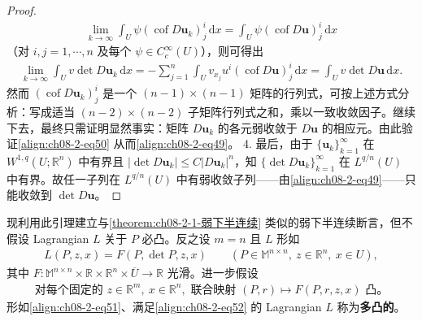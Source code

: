 \documentclass[../../main.tex]{subfiles}
\begin{document}
\begin{lemma}[行列式的弱连续性]
\begin{proof}
\begin{align}
\lim_{k\to\infty}\int_U\psi(\operatorname{cof}D\mathbf{u}_k)_j^i\,\mathrm{d}x=\int_U\psi(\operatorname{cof}D\mathbf{u})_j^i\,\mathrm{d}x\label{align:ch08-2-eq50}
\end{align}
（对 $i,j=1,\cdots,n$ 及每个 $\psi\in C_c^\infty(U)$），则可得出
\begin{align}
\lim_{k\to\infty}\int_U v\det D\mathbf{u}_k\,\mathrm{d}x=-\sum_{j=1}^n\int_U v_{x_j}u^i(\operatorname{cof}D\mathbf{u})_j^i\,\mathrm{d}x=\int_U v\det D\mathbf{u}\,\mathrm{d}x.\label{align:ch08-2-eq49}
\end{align}
然而 $(\operatorname{cof}D\mathbf{u}_k)_j^i$ 是一个 $(n-1)\times(n-1)$ 矩阵的行列式，可按上述方式分析：写成适当 $(n-2)\times(n-2)$ 子矩阵行列式之和，乘以一致收敛因子。继续下去，最终只需证明显然事实：矩阵 $D\mathbf{u}_k$ 的各元弱收敛于 $D\mathbf{u}$ 的相应元。由此验证\eqref{align:ch08-2-eq50} 从而\eqref{align:ch08-2-eq49}。
4. 最后，由于 $\{\mathbf{u}_k\}_{k=1}^\infty$ 在 $W^{1,q}(U;\mathbb{R}^n)$ 中有界且 $|\det D\mathbf{u}_k|\leqslant C|D\mathbf{u}_k|^n$，知 $\{\det D\mathbf{u}_k\}_{k=1}^\infty$ 在 $L^{q/n}(U)$ 中有界。故任一子列在 $L^{q/n}(U)$ 中有弱收敛子列——由\eqref{align:ch08-2-eq49}——只能收敛到 $\det D\mathbf{u}$。
\end{proof}
\end{lemma}

现利用此引理建立与\cref{theorem:ch08-2-1-弱下半连续} 类似的弱下半连续断言，但不假设 Lagrangian $L$ 关于 $P$ 必凸。反之设 $m=n$ 且 $L$ 形如
\begin{align}
L(P,z,x)=F(P,\det P,z,x)\qquad (P\in\mathbb{M}^{n\times n},\ z\in\mathbb{R}^n,\ x\in U),\label{align:ch08-2-eq51}
\end{align}
其中 $F:\mathbb{M}^{n\times n}\times\mathbb{R}\times\mathbb{R}^n\times\overline{U}\to\mathbb{R}$ 光滑。进一步假设
\begin{align}
\text{对每个固定的 }z\in\mathbb{R}^m,\ x\in\mathbb{R}^n,\text{ 联合映射 }(P,r)\mapsto F(P,r,z,x)\text{ 凸。}\label{align:ch08-2-eq52}
\end{align}
形如\eqref{align:ch08-2-eq51}、满足\eqref{align:ch08-2-eq52} 的 Lagrangian $L$ 称为\textbf{多凸的}。
\end{document}
